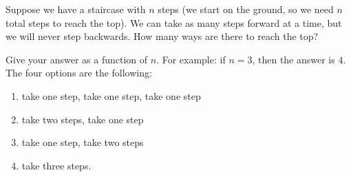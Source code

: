 \item {}

Suppose we have a staircase with $n$ steps (we start on the ground, so we need
$n$ total steps to reach the top). We can take as many steps forward at a time,
but we will never step backwards. How many ways are there to reach the top?

Give your answer as a function of $n$. For example: if $n = 3$, then the answer is $4$. The four options are the following:
\begin{enumerate}[noitemsep, topsep=0pt,label=\arabic*)]
\item take one step, take one step, take one step
\item take two steps, take one step
\item take one step, take two steps
\item take three steps.
\end{enumerate}
